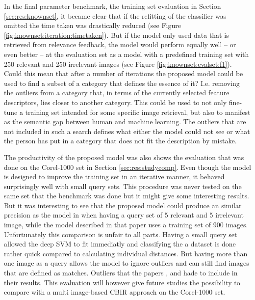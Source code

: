 In the final parameter benchmark, the training set evaluation in Section \ref{sec:res:knownset}, it became clear that if the refitting of the classifier was omitted the time taken was drastically reduced (see Figure \ref{fig:knownset:iteration:timetaken}). But if the model only used data that is retrieved from relevance feedback, the model would perform equally well -- or even better -- at the evaluation set as a model with a predefined training set with 250 relevant and 250 irrelevant images (see Figure \ref{fig:knownset:evalset:f1}). Could this mean that after a number of iterations the proposed model could be used to find a subset of a category that defines the essence of it? I.e. removing the outliers from a category that, in terms of the currently selected feature descriptors, lies closer to another category. This could be used to not only fine-tune a training set intended for some specific image retrieval, but also to manifest as the semantic gap between human and machine learning. The outliers that are not included in such a search defines what either the model could not see or what the person has put in a category that does not fit the description by mistake.


The productivity of the proposed model was also shows the evaluation that was done on the Corel-1000 set in Section \ref{sec:res:studycomp}. Even though the model is designed to improve the training set in an iterative manner, it behaved surprisingly well with small query sets. This procedure was never tested on the same set that the benchmark was done but it might give some interesting results. But it was interesting to see that the proposed model could produce an similar precision as the model in \cite{elalami2014new} when having a query set of 5 relevant and 5 irrelevant image, while the model described in that paper uses a training set of 900 images. Unfortunately this comparison is unfair to all parts. Having a small query set allowed the deep SVM to fit immediatly and classifying the a dataset is done rather quick compared to calculating individual distances. But having more than one image as a query allows the model to ignore outliers and can still find images that are defined as matches. Outliers that the papers \cite{wang2001simplicity}, \cite{subrahmanyam2013modified} and \cite{nagaraja2015low} hade to include in their results. This evaluation will however give future studies the possibility to compare with a multi image-based CBIR approach on the Corel-1000 set.
